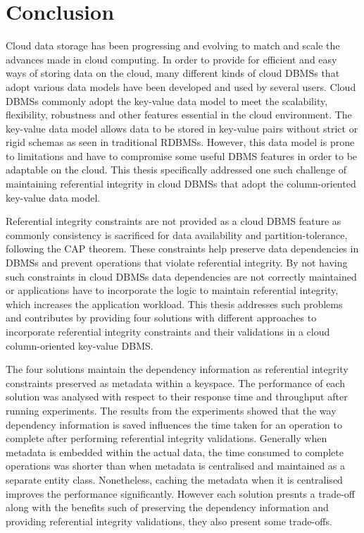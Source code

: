 \chapter{Conclusion}
Cloud data storage has been progressing and evolving to match and scale the
advances made in cloud computing. In order to provide for efficient and easy
ways of storing data on the cloud, many different kinds of cloud \acp{DBMS} that
adopt various data models have been developed and used by several users.
Cloud \acp{DBMS} commonly adopt the key-value data model to meet the
scalability, flexibility, robustness and other features essential in the cloud
environment. The key-value data model allows data to be stored in  key-value
pairs without strict or rigid schemas as seen in traditional \acp{RDBMS}.
However, this data model is prone to limitations and have to compromise some
useful \ac{DBMS} features in order to be adaptable on the cloud.
This thesis specifically addressed one such challenge of maintaining
referential integrity in  cloud \acp{DBMS} that adopt the column-oriented key-value data
model. 

Referential integrity constraints are not provided as a cloud \ac{DBMS} feature
as commonly  consistency is sacrificed for data availability and
partition-tolerance, following the CAP theorem. These constraints help preserve
data dependencies in  \acp{DBMS} and prevent operations that violate
referential integrity. By not having such constraints in cloud \acp{DBMS} data
dependencies are not correctly maintained or applications have to incorporate
the logic to maintain referential integrity, which increases the application
workload. This thesis addresses such problems and contributes by providing four
solutions with different approaches to incorporate referential integrity
constraints and their validations in a cloud column-oriented key-value
\ac{DBMS}.

The four solutions maintain the dependency information as referential integrity
constraints preserved as metadata within a keyspace.  The performance of each
solution was analysed with respect to their response time and throughput after
running experiments. The results from the experiments  showed that the way
dependency information is saved influences the time taken for an operation to
complete after performing referential integrity validations. Generally when
metadata is embedded within the actual data, the time consumed to complete
operations was shorter than when metadata is centralised and maintained as a
separate entity class. Nonetheless, caching the metadata when it is centralised
improves the performance significantly. However each solution presnts a
trade-off along with the  benefits such of preserving the dependency
information and providing referential integrity validations, they also present
some trade-offs.

